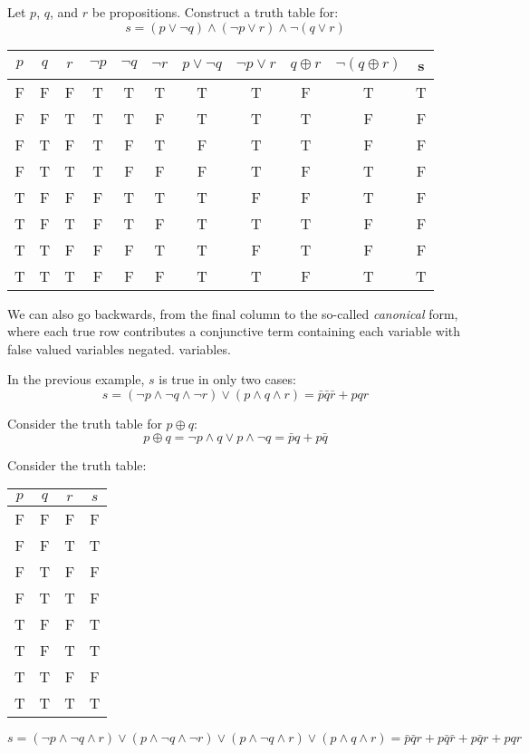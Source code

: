 \documentclass[letterpaper,12pt,fleqn]{article}
\newcommand{\lxor}{\oplus}
\begin{document}
\begin{example}
  Let \(p\), \(q\), and \(r\) be propositions.  Construct a truth table for:
  \[s=(p\lor\lnot q)\land(\lnot p\lor r)\land\lnot(q\lor r)\]

  \begin{tabular}{ccc|ccc|c|c|c|c|c}
    \(p\) & \(q\) & \(r\) & \(\lnot p\) & \(\lnot q\) & \(\lnot r\) & \(p\lor\lnot q\) & \(\lnot p\lor r\) &
    \(q\lxor r\) & \(\lnot(q\lxor r)\) & s \\
    \hline
    F & F & F & T & T & T & T & T & F & T & T \\
    F & F & T & T & T & F & T & T & T & F & F \\
    F & T & F & T & F & T & F & T & T & F & F \\
    F & T & T & T & F & F & F & T & F & T & F \\
    T & F & F & F & T & T & T & F & F & T & F \\
    T & F & T & F & T & F & T & T & T & F & F \\
    T & T & F & F & F & T & T & F & T & F & F \\
    T & T & T & F & F & F & T & T & F & T & T
  \end{tabular}
\end{example}

We can also go backwards, from the final column to the so-called \emph{canonical} form, where each true row
contributes a conjunctive term containing each variable with false valued variables negated.
variables.

\begin{example}
  In the previous example, \(s\) is true in only two cases:
  \[s=(\lnot p\land\lnot q\land\lnot r)\lor(p\land q\land r)=\bar{p}\bar{q}\bar{r}+pqr\]
\end{example}

\begin{example}
  Consider the truth table for \(p\lxor q\):
  \[p\lxor q=\lnot p\land q\lor p\land\lnot q=\bar{p}q+p\bar{q}\]
\end{example}

\begin{example}
  Consider the truth table:

  \begin{tabular}{ccc|c}
    \(p\) & \(q\) & \(r\) & \(s\) \\
    \hline
    F & F & F & F \\
    F & F & T & T \\
    F & T & F & F \\
    F & T & T & F \\
    T & F & F & T \\
    T & F & T & T \\
    T & T & F & F \\
    T & T & T & T \\
  \end{tabular}
  \[s=(\lnot p\land\lnot q\land r)\lor(p\land\lnot q\land\lnot r)\lor(p\land\lnot q\land r)\lor(p\land q\land r)
  =\bar{p}\bar{q}r+p\bar{q}\bar{r}+p\bar{q}r+pqr\]
\end{example}
\end{document}
